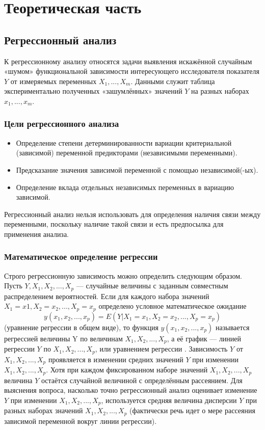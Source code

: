\section{Теоретическая часть}

\subsection{Регрессионный анализ}

К регрессионному анализу относятся задачи выявления искажённой случайным «шумом» функциональной зависимости интересующего исследователя показателя $Y$ от измеряемых переменных $X_1,...,X_m$. Данными служит таблица экспериментально полученных «зашумлённых» значений $Y$ на разных наборах $x_1,...,x_m$. \cite{lag}

\subsubsection{Цели регрессионного анализа}

\begin{itemize}
\item Определение степени детерминированности вариации критериальной (зависимой) переменной предикторами (независимыми переменными).
\item Предсказание значения зависимой переменной с помощью независимой(-ых).
\item Определение вклада отдельных независимых переменных в вариацию зависимой.
\end{itemize}

Регрессионный анализ нельзя использовать для определения наличия связи между переменными, поскольку наличие такой связи и есть предпосылка для применения анализа.

\subsubsection{Математическое определение регрессии}

Строго регрессионную зависимость можно определить следующим образом. Пусть $Y, X_1, X_2,...,X_p$  — случайные величины с заданным совместным распределением вероятностей. Если для каждого набора значений $X_1=x1,X_2=x_2,...,X_p=x_p$ определено условное математическое ожидание
\begin{equation}
y(x_1,x_2,...,x_p) = E(Y|X_1 = x_1, X_2 = x_2, ..., X_p = x_p)
\end{equation}
(уравнение регрессии в общем виде), то функция $y(x_1,x_2,...,x_p)$ называется регрессией величины Y по величинам $X_1,X_2,...,X_p$, а её график — линией регрессии $Y$ по $X_1,X_2,...,X_p$, или уравнением регрессии \cite{applregr}.
Зависимость $Y$ от $X_1,X_2,...,X_p$ проявляется в изменении средних значений $Y$ при изменении $X_1,X_2,...,X_p$. Хотя при каждом фиксированном наборе значений $X_1,X_2,...,X_p$ величина $Y$ остаётся случайной величиной с определённым рассеянием.
Для выяснения вопроса, насколько точно регрессионный анализ оценивает изменение $Y$ при изменении $X_1,X_2,...,X_p$, используется средняя величина дисперсии $Y$ при разных наборах значений $X_1,X_2,...,X_p$ (фактически речь идет о мере рассеяния зависимой переменной вокруг линии регрессии).

